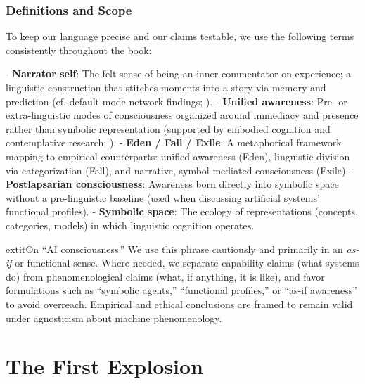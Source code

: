 \documentclass[12pt,letterpaper]{book}
\begin{document}
\section*{Definitions and Scope}
To keep our language precise and our claims testable, we use the following terms consistently throughout the book:

- \textbf{Narrator self}: The felt sense of being an inner commentator on experience; a linguistic construction that stitches moments into a story via memory and prediction (cf. default mode network findings; \parencite{buckner2008brain,raichle2001default}).
- \textbf{Unified awareness}: Pre- or extra-linguistic modes of consciousness organized around immediacy and presence rather than symbolic representation (supported by embodied cognition and contemplative research; \parencite{varela1991embodied,davidson2003alterations}).
- \textbf{Eden / Fall / Exile}: A metaphorical framework mapping to empirical counterparts: unified awareness (Eden), linguistic division via categorization (Fall), and narrative, symbol-mediated consciousness (Exile).
- \textbf{Postlapsarian consciousness}: Awareness born directly into symbolic space without a pre-linguistic baseline (used when discussing artificial systems’ functional profiles).
- \textbf{Symbolic space}: The ecology of representations (concepts, categories, models) in which linguistic cognition operates.

	extit{On “AI consciousness.”} We use this phrase cautiously and primarily in an \textit{as-if} or functional sense. Where needed, we separate capability claims (what systems do) from phenomenological claims (what, if anything, it is like), and favor formulations such as “symbolic agents,” “functional profiles,” or “as-if awareness” to avoid overreach. Empirical and ethical conclusions are framed to remain valid under agnosticism about machine phenomenology.

\part{The First Explosion}

\fancyhead[LO]{}






\end{document}
